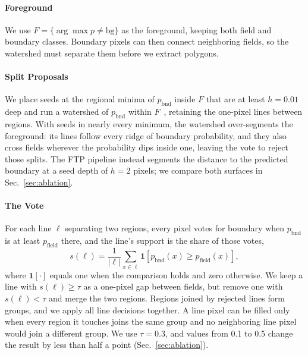 \documentclass[journal]{IEEEtran}
\begin{document}
\paragraph{Foreground}
We use $F=\{\arg\max p \neq \mathrm{bg}\}$ as the foreground, keeping both field and boundary classes.
Boundary pixels can then connect neighboring fields, so the watershed must separate them before we extract polygons.

\paragraph{Split Proposals}
We place seeds at the regional minima of $p_{\mathrm{bnd}}$ inside $F$ that are at least $h=0.01$ deep and run a watershed of $p_{\mathrm{bnd}}$ within $F$~\cite{soille2004morphological}, retaining the one-pixel lines between regions.
With seeds in nearly every minimum, the watershed over-segments the foreground: its lines follow every ridge of boundary probability, and they also cross fields wherever the probability dips inside one, leaving the vote to reject those splits.
The FTP pipeline instead segments the distance to the predicted boundary at a seed depth of $h=2$ pixels; we compare both surfaces in Sec.~\ref{sec:ablation}.

\paragraph{The Vote}
For each line $\ell$ separating two regions, every pixel votes for boundary when $p_{\mathrm{bnd}}$ is at least $p_{\mathrm{field}}$ there, and the line's support is the share of those votes,
\begin{equation}
s(\ell)=\frac{1}{|\ell|}\sum_{x\in\ell}\mathbf{1}\left[p_{\mathrm{bnd}}(x)\geq p_{\mathrm{field}}(x)\right],
\label{eq:support}
\end{equation}
where $\mathbf{1}[\cdot]$ equals one when the comparison holds and zero otherwise.
We keep a line with $s(\ell)\geq\tau$ as a one-pixel gap between fields, but remove one with $s(\ell)<\tau$ and merge the two regions.
Regions joined by rejected lines form groups, and we apply all line decisions together.
A line pixel can be filled only when every region it touches joins the same group and no neighboring line pixel would join a different group.
We use $\tau=0.3$, and values from 0.1 to 0.5 change the result by less than half a point (Sec.~\ref{sec:ablation}).
\end{document}

